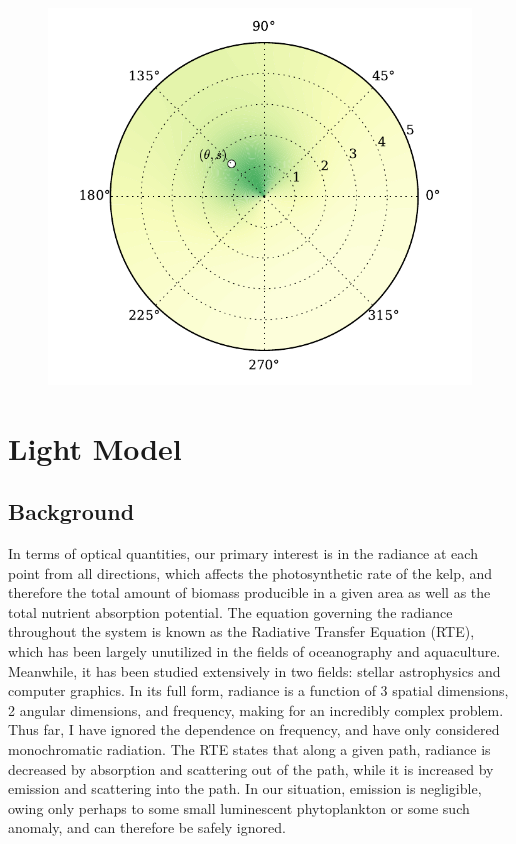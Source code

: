 \begin{figure}[H]
	\centering
	\includegraphics[width=\linewidth]{prob_shade}
	\vspace{-2em}
	\label{fig:prob_shade}
\end{figure}


\section{Light Model}

\subsection{Background}
In terms of optical quantities, our primary interest is in the radiance at each point from all directions, which affects the photosynthetic rate of the kelp, and therefore the total amount of biomass producible in a given area as well as the total nutrient absorption potential.
The equation governing the radiance throughout the system is known as the Radiative Transfer Equation (RTE), which has been largely unutilized in the fields of oceanography and aquaculture.
Meanwhile, it has been studied extensively in two fields: stellar astrophysics and computer graphics.
In its full form, radiance is a function of 3 spatial dimensions, 2 angular dimensions, and frequency, making for an incredibly complex problem.
Thus far, I have ignored the dependence on frequency, and have only considered monochromatic radiation.
The RTE states that along a given path, radiance is decreased by absorption and scattering out of the path, while it is increased by emission and scattering into the path.
In our situation, emission is negligible, owing only perhaps to some small luminescent phytoplankton or some such anomaly, and can therefore be safely ignored.
